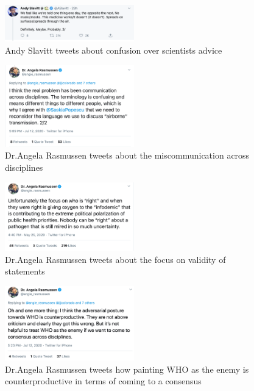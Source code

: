 \documentclass[acmsmall,authordraft]{acmart}
\begin{document}
\begin{figure}
  \includegraphics[width=0.5\textwidth]{Pictures/Appendix_Tweets/andy slavitt tweet2.png}
  \caption{Andy Slavitt tweets about confusion over scientists advice}
  \label{andy_slavitt_tweet2}
\end{figure}

\begin{figure}
  \includegraphics[width=0.5\textwidth]{Pictures/Appendix_Tweets/angela rasmussen tweet.png}
  \caption{Dr.Angela Rasmussen tweets about the miscommunication across disciplines}
  \label{angela_rasmussen_tweet}
\end{figure}

\begin{figure}
  \includegraphics[width=0.5\textwidth]{Pictures/Appendix_Tweets/angela rasmussen tweet2.png}
  \caption{Dr.Angela Rasmussen tweets about the focus on validity of statements}
  \label{angela_rasmussen_tweet2}
\end{figure}

\begin{figure}
  \includegraphics[width=0.5\textwidth]{Pictures/Appendix_Tweets/angela rasmussen tweet3.png}
  \caption{Dr.Angela Rasmussen tweets how painting WHO as the enemy is counterproductive in terms of coming to a consensus}
  \label{angela_rasmussen_tweet3}
\end{figure}
\end{document}
